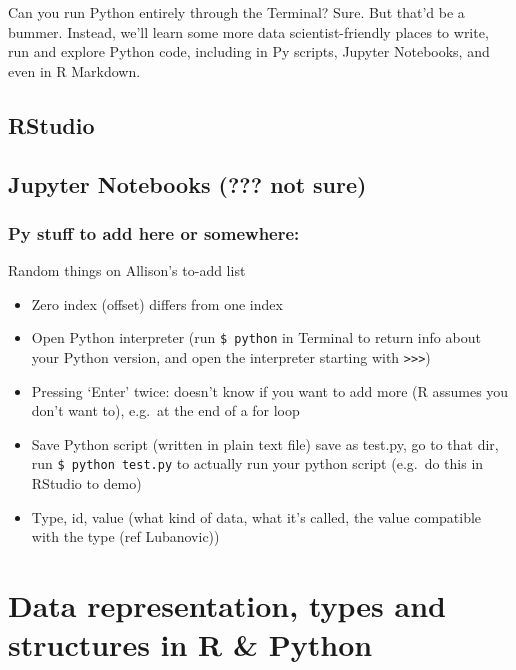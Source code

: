 \documentclass[
]{book}
\providecommand{\tightlist}{%
  \setlength{\itemsep}{0pt}\setlength{\parskip}{0pt}}
\begin{document}
Can you run Python entirely through the Terminal? Sure. But that'd be a bummer. Instead, we'll learn some more data scientist-friendly places to write, run and explore Python code, including in Py scripts, Jupyter Notebooks, and even in R Markdown.

\hypertarget{rstudio}{%
\section{RStudio}\label{rstudio}}

\hypertarget{jupyter-notebooks-not-sure}{%
\section{Jupyter Notebooks (??? not sure)}\label{jupyter-notebooks-not-sure}}

\hypertarget{py-stuff-to-add-here-or-somewhere}{%
\subsection{Py stuff to add here or somewhere:}\label{py-stuff-to-add-here-or-somewhere}}

Random things on Allison's to-add list

\begin{itemize}
\tightlist
\item
  Zero index (offset) differs from one index
\item
  Open Python interpreter (run \texttt{\$\ python} in Terminal to return info about your Python version, and open the interpreter starting with \texttt{\textgreater{}\textgreater{}\textgreater{}})
\item
  Pressing `Enter' twice: doesn't know if you want to add more (R assumes you don't want to), e.g.~at the end of a for loop
\item
  Save Python script (written in plain text file) save as test.py, go to that dir, run \texttt{\$\ python\ test.py} to actually run your python script (e.g.~do this in RStudio to demo)
\item
  Type, id, value (what kind of data, what it's called, the value compatible with the type (ref Lubanovic))
\end{itemize}

\hypertarget{types}{%
\chapter{Data representation, types and structures in R \& Python}\label{types}}
\end{document}
